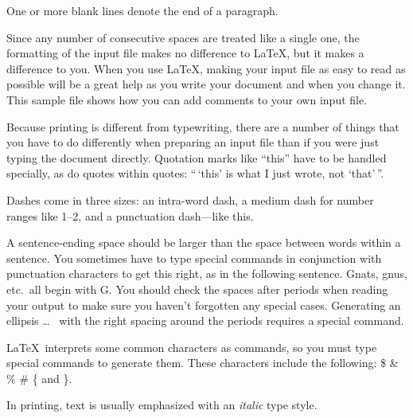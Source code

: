 \documentclass{article}      %
\begin{document}
One   or more   blank lines denote the  end
of  a paragraph.

Since any number of consecutive spaces are treated
like a single one, the formatting of the input
file makes no difference to
      \LaTeX,                %
but it makes a difference to you.  When you use
\LaTeX, making your input file as easy to read
as possible will be a great help as you write
your document and when you change it.  This sample
file shows how you can add comments to your own input
file.

Because printing is different from typewriting,
there are a number of things that you have to do
differently when preparing an input file than if
you were just typing the document directly.
Quotation marks like
       ``this''
have to be handled specially, as do quotes within
quotes:
       ``\,`this'            %
        is what I just
        wrote, not  `that'\,''.

Dashes come in three sizes: an
       intra-word
dash, a medium dash for number ranges like
       1--2,
and a punctuation
       dash---like
this.

A sentence-ending space should be larger than the
space between words within a sentence.  You
sometimes have to type special commands in
conjunction with punctuation characters to get
this right, as in the following sentence.
       Gnats, gnus, etc.\ all  %
       begin with G\@.         %
You should check the spaces after periods when
reading your output to make sure you haven't
forgotten any special cases.  Generating an
ellipsis
       \ldots\               %
with the right spacing around the periods requires
a special command.

\LaTeX\ interprets some common characters as
commands, so you must type special commands to
generate them.  These characters include the
following:
       \$ \& \% \# \{ and \}.

In printing, text is usually emphasized with an
       \emph{italic}
type style.
\end{document}

